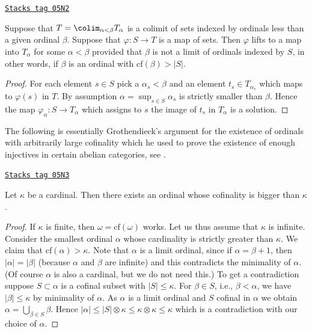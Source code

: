 \begin{lemma}
\label{sets-lemma-map-from-set-lifts}
\href{https://stacks.math.columbia.edu/tag/05N2}{\texttt{Stacks tag 05N2}}

Suppose that $T = \colim_{\alpha < \beta} T_\alpha$
is a colimit of sets indexed by ordinals less than a given ordinal $\beta$.
Suppose that $\varphi : S \to T$ is a map of sets.
Then $\varphi$ lifts to a map into $T_\alpha$ for some $\alpha < \beta$
provided that $\beta$ is not a limit of ordinals indexed by $S$,
in other words, if $\beta$ is an ordinal with $\text{cf}(\beta) > |S|$.
\end{lemma}

\begin{proof}
For each element $s \in S$ pick a $\alpha_s < \beta$ and an element
$t_s \in T_{\alpha_s}$ which maps to $\varphi(s)$ in $T$.
By assumption $\alpha = \sup_{s \in S} \alpha_s$ is strictly smaller
than $\beta$. Hence the map $\varphi_\alpha : S \to T_\alpha$
which assigns to $s$ the image of $t_s$ in $T_\alpha$ is a solution.
\end{proof}

The following is essentially Grothendieck's argument for the existence
of ordinals with arbitrarily large cofinality which he used to prove
the existence of enough injectives in certain abelian categories, see
\cite{Tohoku}.

\begin{proposition}
\label{sets-proposition-exist-ordinals-large-cofinality}
\href{https://stacks.math.columbia.edu/tag/05N3}{\texttt{Stacks tag 05N3}}

Let $\kappa$ be a cardinal. Then there exists an ordinal
whose cofinality is bigger than $\kappa$.
\end{proposition}

\begin{proof}
If $\kappa$ is finite, then $\omega = \text{cf}(\omega)$ works.
Let us thus assume that $\kappa$ is infinite.
Consider the smallest ordinal $\alpha$ whose cardinality is strictly greater
than $\kappa$. We claim that $\text{cf}(\alpha) > \kappa$.
Note that $\alpha$ is a limit ordinal, since if $\alpha = \beta + 1$, then
$|\alpha| = |\beta|$ (because $\alpha$ and $\beta$ are infinite) and
this contradicts the minimality of $\alpha$. (Of course $\alpha$ is also
a cardinal, but we do not need this.) To get a contradiction
suppose $S \subset \alpha$ is a cofinal
subset with $|S| \leq \kappa$. For $\beta \in S$, i.e., $\beta < \alpha$,
we have $|\beta| \leq \kappa$ by minimality of $\alpha$. As $\alpha$ is
a limit ordinal and $S$ cofinal in $\alpha$ we obtain
$\alpha = \bigcup_{\beta \in S} \beta$. Hence
$|\alpha| \leq |S| \otimes \kappa \leq \kappa \otimes \kappa \leq \kappa$
which is a contradiction with our choice of $\alpha$.
\end{proof}

